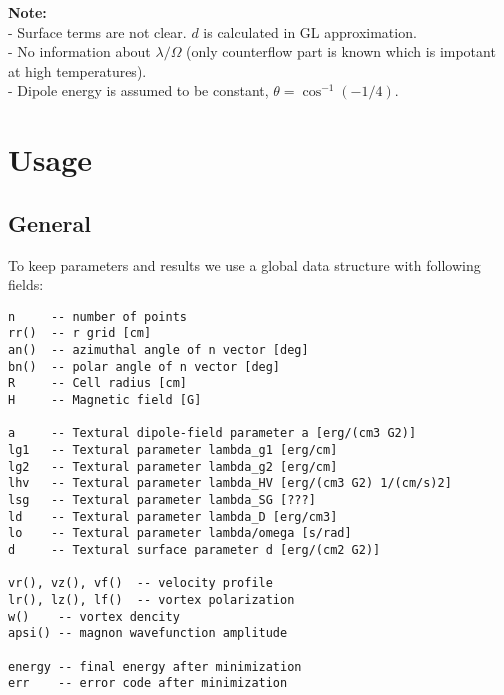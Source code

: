 \documentclass[a4paper]{article}
\begin{document}
{\bf Note:}\\
- Surface terms are not clear. $d$ is calculated in GL approximation.\\
- No information about $\lambda/\Omega$ (only counterflow part is known
which is impotant at high temperatures).\\
- Dipole energy is assumed to be constant, $\theta=\cos^{-1}(-1/4)$.\\

\eject
\section*{Usage}

\subsection*{General}
To keep parameters and results we use a global data structure with following fields:

\begin{verbatim}
n     -- number of points
rr()  -- r grid [cm]
an()  -- azimuthal angle of n vector [deg]
bn()  -- polar angle of n vector [deg]
R     -- Cell radius [cm]
H     -- Magnetic field [G]

a     -- Textural dipole-field parameter a [erg/(cm3 G2)]
lg1   -- Textural parameter lambda_g1 [erg/cm]
lg2   -- Textural parameter lambda_g2 [erg/cm]
lhv   -- Textural parameter lambda_HV [erg/(cm3 G2) 1/(cm/s)2]
lsg   -- Textural parameter lambda_SG [???]
ld    -- Textural parameter lambda_D [erg/cm3]
lo    -- Textural parameter lambda/omega [s/rad]
d     -- Textural surface parameter d [erg/(cm2 G2)]

vr(), vz(), vf()  -- velocity profile
lr(), lz(), lf()  -- vortex polarization
w()    -- vortex dencity
apsi() -- magnon wavefunction amplitude

energy -- final energy after minimization
err    -- error code after minimization
\end{verbatim}
\end{document}
